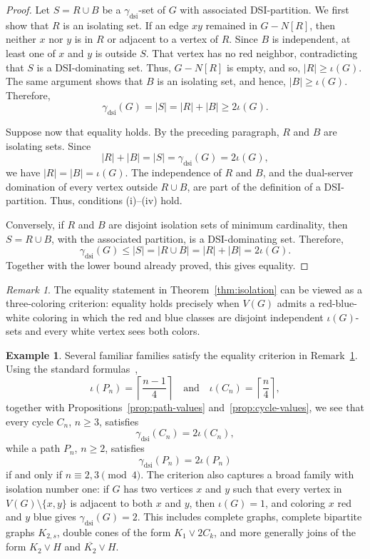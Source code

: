 \documentclass[11pt]{article}
\theoremstyle{definition}
\newtheorem{example}[theorem]{Example}
\theoremstyle{remark}
\newtheorem{remark}[theorem]{Remark}
\newcommand{\dsi}{\mathrm{dsi}}
\newcommand{\iso}{\iota}
\begin{document}
\begin{proof}
Let \(S=R\cup B\) be a $\gamma_{\dsi}$-set of \(G\) with associated
DSI-partition. We first show that \(R\) is an isolating set. If an edge
\(xy\) remained in \(G-N[R]\), then neither \(x\) nor \(y\) is in \(R\) or
adjacent to a vertex of \(R\). Since \(B\) is independent, at least one of
\(x\) and \(y\) is outside \(S\). That vertex has no red neighbor,
contradicting that \(S\) is a DSI-dominating set. Thus, \(G-N[R]\) is
empty, and so, \(|R|\ge \iso(G)\). The same argument shows that \(B\) is an
isolating set, and hence, \(|B|\ge \iso(G)\). Therefore,
\[
 \gamma_{\dsi}(G)=  |S|=|R|+|B|\ge 2\iso(G).
\]


Suppose now that equality holds. By the preceding
paragraph, \(R\) and \(B\) are isolating sets. Since
\[
   |R|+|B|=|S|=\gamma_{\dsi}(G)=2\iso(G),
\]
we have \(|R|=|B|=\iso(G)\). The independence of \(R\) and \(B\), and the
dual-server domination of every vertex outside \(R\cup B\), are part of the
definition of a DSI-partition. Thus, conditions (i)--(iv) hold.

Conversely, if  \(R\) and \(B\) are disjoint isolation sets of minimum cardinality, then \(S =R\cup B\), with the
associated partition, is a DSI-dominating set. Therefore, 
\[
   \gamma_{\dsi}(G)\le |S| = |R\cup B| = |R| + |B| =2\iso(G).
\]
Together with the lower bound already proved, this gives equality.
\end{proof}

\begin{remark}
\label{rem:isolation-equality-coloring}
The equality statement in Theorem~\ref{thm:isolation} can be viewed as a
three-coloring criterion: equality holds precisely when \(V(G)\) admits a
red-blue-white coloring in which the red and blue classes are disjoint
independent \(\iso(G)\)-sets and every white vertex sees both colors.
\end{remark}

\begin{example}
\label{ex:isolation-equality-families}
Several familiar families satisfy the equality criterion in
Remark~\ref{rem:isolation-equality-coloring}. Using the standard formulas~\cite{CaroHansberg17},
\[
   \iso(P_n)=\left\lceil\frac{n-1}{4}\right\rceil
   \quad\text{and}\quad
   \iso(C_n)=\left\lceil\frac n4\right\rceil,
\]
together with Propositions~\ref{prop:path-values}
and~\ref{prop:cycle-values}, we see that every cycle \(C_n\), \(n\ge 3\),
satisfies
\[
   \gamma_{\dsi}(C_n)=2\iso(C_n),
\]
while a path \(P_n\), \(n\ge 2\), satisfies
\[
   \gamma_{\dsi}(P_n)=2\iso(P_n)
\]
if and only if \(n\equiv 2,3\pmod 4\). The criterion also captures a broad
family with isolation number one: if \(G\) has two vertices \(x\) and \(y\)
such that every vertex in \(V(G)\setminus\{x,y\}\) is adjacent to both
\(x\) and \(y\), then \(\iso(G)=1\), and coloring \(x\) red and \(y\) blue
gives \(\gamma_{\dsi}(G)=2\). This includes complete graphs, complete
bipartite graphs \(K_{2,s}\), double cones of the form $K_1 \vee 2 C_k$, and more generally joins of the
form \(K_2\vee H\) and \(\overline{K_2}\vee H\).
\end{example}
\end{document}
